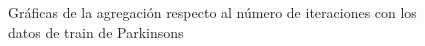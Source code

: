 \documentclass[11pt,a4paper]{article}
\begin{document}
\begin{figure}[H]
	\caption{Gráficas de la agregación respecto al número de iteraciones con los datos de train de Parkinsons}
\end{figure}
\end{document}
